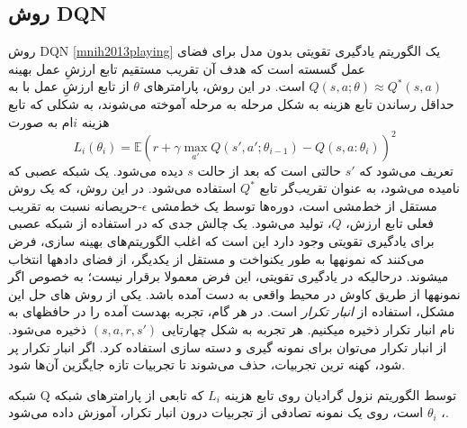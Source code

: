 \subsection{روش DQN}
روش DQN 
\ref{mnih2013playing}
 یک الگوریتم یادگیری تقویتی بدون مدل برای فضای عمل گسسته است که هدف آن تقریب مستقیم تابع ارزشِ عمل بهینه 
 $Q(s,a; \theta) \approx  Q^*(s,a)$
 است. در این روش، پارامترهای $\theta$ از تابع ارزشِ عمل با به حداقل رساندن تابع هزینه به شکل مرحله به مرحله آموخته می‌شوند، به شکلی که تابع هزینه $i$ام به صورت
 $$L_i(\theta_i) = \mathbb{E} {\left( r+\gamma \max_{a'} Q(s',a'; \theta_{i-1})- Q(s,a:\theta_i) \right)}^2$$
 تعریف می‌شود که 
$s'$
 حالتی است که بعد از حالت $s$ دیده می‌شود. یک شبکه عصبی که 
\textit{}
  نامیده می‌شود، به عنوان تقریب‌گر تابع $Q^*$ استفاده می‌شود.
در این روش، که یک روش مستقل از خط‌مشی است، دوره‌ها توسط یک خط‌مشی 
$\epsilon$-حریصانه
نسبت به تقریب فعلی تابع ارزش، $Q$، تولید می‌شود. 
یک چالش جدی که در استفاده از شبکه عصبی برای یادگیری تقویتی وجود دارد این است که اغلب الگوریتم‌های بهینه سازی، فرض می‌کنند که نمونه\nf ها به طور یکنواخت و مستقل از یکدیگر، از فضای داده\nf ها انتخاب می\nf شوند. درحالی\nf که در یادگیری تقویتی، این فرض معمولا برقرار نیست؛ به خصوص اگر نمونه\nf ها از طریق کاوش در محیط واقعی به دست آمده باشد. یکی از روش های  حل این مشکل، استفاده از 
\textit{انبار تکرار}
است. در هر گام، تجربه به\nf دست آمده را در حافظه\nf ای به نام انبار تکرار ذخیره می\nf کنیم. هر تجربه به شکل چهارتایی 
$(s,a,r,s')$
ذخیره می‌شود. از انبار تکرار می‌توان برای نمونه گیری و دسته  سازی استفاده کرد. اگر انبار تکرار پر شود، کهنه ترین تجربیات، حذف می‌شوند تا تجربیات تازه جایگزین آن‌ها شود.


 شبکه Q توسط الگوریتم نزول گرادیان روی تابع هزینه 
$L_i$
که تابعی از پارامترهای شبکه 
،
$\theta_i$
 است، روی یک نمونه تصادفی از تجربیات درون انبار تکرار، آموزش داده می‌شود.







